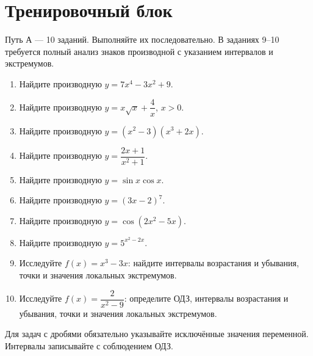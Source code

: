 \documentclass[a4paper,12pt]{article}
\begin{document}
\section*{Тренировочный блок}\label{training}
\textcolor{darkaccent}{Путь А --- 10 заданий.} Выполняйте их последовательно. В заданиях 9--10 требуется полный анализ знаков производной с указанием интервалов и экстремумов.
\vspace{4mm}
\begin{enumerate}[leftmargin=*,itemsep=9pt]
\item Найдите производную $y=7x^4-3x^2+9$.
\item Найдите производную $y=x\sqrt{x}+\dfrac4x$, $x>0$.
\item Найдите производную $y=(x^2-3)(x^3+2x)$.
\item Найдите производную $y=\dfrac{2x+1}{x^2+1}$.
\item Найдите производную $y=\sin x\cos x$.
\item Найдите производную $y=(3x-2)^7$.
\item Найдите производную $y=\cos(2x^2-5x)$.
\item Найдите производную $y=5^{x^2-2x}$.
\item Исследуйте $f(x)=x^3-3x$: найдите интервалы возрастания и убывания, точки и значения локальных экстремумов.
\item Исследуйте $f(x)=\dfrac{2}{x^2-9}$: определите ОДЗ, интервалы возрастания и убывания, точки и значения локальных экстремумов.
\end{enumerate}
\vfill
\textcolor{softgray}{\small Для задач с дробями обязательно указывайте исключённые значения переменной. Интервалы записывайте с соблюдением ОДЗ.}
\clearpage
\end{document}
